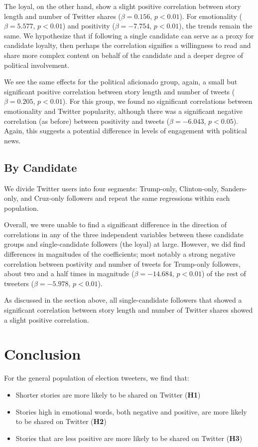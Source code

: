 \documentclass[letterpaper]{article}
\begin{document}
The loyal, on the other hand, show a slight positive correlation between story length and number of Twitter shares ($\beta=0.156$, $p<0.01$). For emotionality ($\beta=5.577$, $p<0.01$) and positivity ($\beta=-7.754$, $p<0.01$), the trends remain the same. We hypothesize that if following a single candidate can serve as a proxy for candidate loyalty, then perhaps the correlation signifies a willingness to read and share more complex content on behalf of the candidate and a deeper degree of political involvement.

We see the same effects for the political aficionado group, again, a small but significant positive correlation between story length and number of tweets ($\beta=0.205$, $p<0.01$). For this group, we found no significant correlations between emotionality and Twitter popularity, although there was a significant negative correlation (as before) between positivity and tweets ($\beta=-6.043$, $p<0.05$). Again, this suggests a potential difference in levels of engagement with political news. 

\subsection{By Candidate} 

We divide Twitter users into four segments: Trump-only, Clinton-only, Sanders-only, and Cruz-only followers and repeat the same regressions within each population. 

Overall, we were unable to find a significant difference in the direction of correlations in any of the three independent variables between these candidate groups and single-candidate followers (the loyal) at large. However, we did find differences in magnitudes of the coefficients; most notably a strong negative correlation between postivity and number of tweets for Trump-only followers, about two and a half times in magnitude ($\beta=-14.684$, $p<0.01$) of the rest of tweeters ($\beta=−5.978$, $p<0.01$). 

As discussed in the section above, all single-candidate followers that showed a significant correlation between story length and number of Twitter shares showed a slight positive correlation.

\section{Conclusion}

For the general population of election tweeters, we find that:
\begin{itemize}
    \item Shorter stories are more likely to be shared on Twitter (\textbf{H1})
    \item Stories high in emotional words, both negative and positive, are more likely to be shared on Twitter (\textbf{H2})
    \item Stories that are less positive are more likely to be shared on Twitter (\textbf{H3})
\end{itemize}
\end{document}
